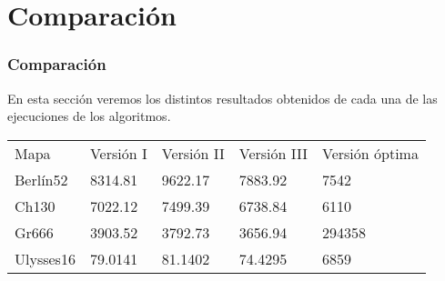 \documentclass{beamer}
\begin{document}
\section{Comparación}
\begin{frame}
	\frametitle{Comparación}
	En esta sección veremos los distintos resultados obtenidos de cada una de las ejecuciones de los algoritmos.
	
	\begin{table}[H]
		\centering
	
		
		\begin{tabular}{l|l|l|l|l}
		  Mapa	& Versión I & Versión II & Versión III  & Versión óptima  \\
		Berlín52	&  8314.81  &9622.17  & 7883.92 & 7542  \\
		Ch130	& 7022.12   & 7499.39  & 6738.84 & 6110  \\
		Gr666	&  3903.52  & 3792.73 & 3656.94 & 294358 \\
		Ulysses16	& 79.0141
		  & 81.1402  & 74.4295 & 6859
		\end{tabular}
	
	\end{table}
	
\end{frame}
\end{document}
